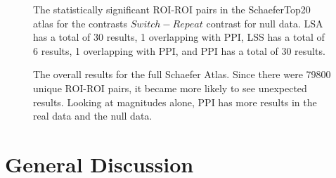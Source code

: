 \documentclass[phd,appendix,figures]{uithesis}
\begin{document}
\begin{figure}[H]
  \ContinuedFloat
  \centering


  \caption[All contrasts for all atlases for all data for LSA/LSS versus PPI continued...]{
      The statistically significant ROI-ROI pairs in the SchaeferTop20 atlas
      for the contrasts $Switch - Repeat$ contrast for null data.
      LSA has a total of 30 results, 1 overlapping with PPI,
      LSS has a total of 6 results, 1 overlapping with PPI,
      and PPI has a total of 30 results.
  }
  \label{fig:data-null_type-brain_atlas-schaeferbest_contrast-switchxrepeat}
\end{figure}

\begin{figure}[H]
  \centering


  \caption[Comparison of LSA/LSS/PPI using participant data and the Schaefer atlas]{
      The overall results for the full Schaefer Atlas.
      Since there were 79800 unique ROI-ROI pairs, it became more likely
      to see unexpected results.
      Looking at magnitudes alone, PPI has more results in the real data
      and the null data.
  }
  \label{fig:schaefer_binomial_ppi}
\end{figure}

\chapter{General Discussion}
\end{document}
